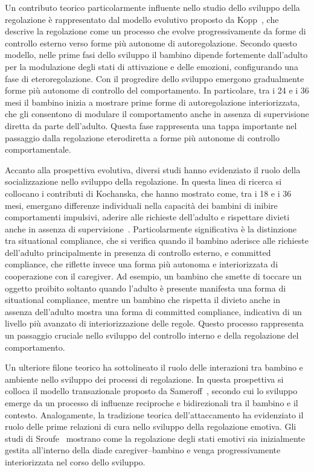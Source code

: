        Un contributo teorico particolarmente influente nello studio dello sviluppo della regolazione è rappresentato dal modello evolutivo proposto da Kopp~\cite{kopp1982}, che descrive la regolazione come un processo che evolve progressivamente da forme di controllo esterno verso forme più autonome di autoregolazione. Secondo questo modello, nelle prime fasi dello sviluppo il bambino dipende fortemente dall'adulto per la modulazione degli stati di attivazione e delle emozioni, configurando una fase di eteroregolazione. Con il progredire dello sviluppo emergono gradualmente forme più autonome di controllo del comportamento. In particolare, tra i 24 e i 36 mesi il bambino inizia a mostrare prime forme di autoregolazione interiorizzata, che gli consentono di modulare il comportamento anche in assenza di supervisione diretta da parte dell'adulto. Questa fase rappresenta una tappa importante nel passaggio dalla regolazione eterodiretta a forme più autonome di controllo comportamentale.

        Accanto alla prospettiva evolutiva, diversi studi hanno evidenziato il ruolo della socializzazione nello sviluppo della regolazione. In questa linea di ricerca si collocano i contributi di Kochanska, che hanno mostrato come, tra i 18 e i 36 mesi, emergano differenze individuali nella capacità dei bambini di inibire comportamenti impulsivi, aderire alle richieste dell'adulto e rispettare divieti anche in assenza di supervisione~\cite{kochanska2001,kochanska2006}. Particolarmente significativa è la distinzione tra situational compliance, che si verifica quando il bambino aderisce alle richieste dell'adulto principalmente in presenza di controllo esterno, e committed compliance, che riflette invece una forma più autonoma e interiorizzata di cooperazione con il caregiver. Ad esempio, un bambino che smette di toccare un oggetto proibito soltanto quando l'adulto è presente manifesta una forma di situational compliance, mentre un bambino che rispetta il divieto anche in assenza dell'adulto mostra una forma di committed compliance, indicativa di un livello più avanzato di interiorizzazione delle regole. Questo processo rappresenta un passaggio cruciale nello sviluppo del controllo interno e della regolazione del comportamento.

        Un ulteriore filone teorico ha sottolineato il ruolo delle interazioni tra bambino e ambiente nello sviluppo dei processi di regolazione. In questa prospettiva si colloca il modello transazionale proposto da Sameroff~\cite{sameroff2009}, secondo cui lo sviluppo emerge da un processo di influenze reciproche e bidirezionali tra il bambino e il contesto. Analogamente, la tradizione teorica dell'attaccamento ha evidenziato il ruolo delle prime relazioni di cura nello sviluppo della regolazione emotiva. Gli studi di Sroufe~\cite{sroufe1996} mostrano come la regolazione degli stati emotivi sia inizialmente gestita all'interno della diade caregiver--bambino e venga progressivamente interiorizzata nel corso dello sviluppo.

